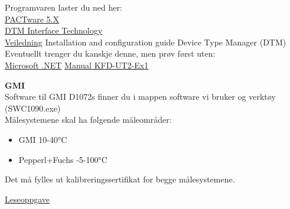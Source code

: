 Programvaren laster du ned her: 
\\
\href {https://www.pepperl-fuchs.com/norway/no/classid_163.htm?view=productdetails&prodid=83574#software}{PACTware 5.X}
\\
\href {https://www.pepperl-fuchs.com/norway/no/classid_1804.htm?view=productdetails&prodid=32802}{DTM Interface Technology}
\\
 

\href{https://files.pepperl-fuchs.com/webcat/navi/productInfo/doct/tdoct1599c_eng.pdf?v=20200320004907}{Veiledning} Installation and configuration guide Device Type Manager (DTM)
\\  
Eventuellt trenger du kanskje denne, men prøv først uten:
\\
\href {https://www.pepperl-fuchs.com/norway/no/classid_1805.htm?view=productdetails&prodid=27434}{Microsoft .NET}
\vskip 5pt 
\vskip 5pt 
\href {https://files.pepperl-fuchs.com/webcat/navi/productInfo/doct/tdoct0735e_eng.pdf?v=20200320004741}{Manual KFD-UT2-Ex1}

\vskip 5pt 

\textbf{GMI}
\\
Software til GMI D1072s finner du i mappen software vi bruker og verktøy (SWC1090.exe)
\\
Målesystemene skal ha følgende måleområder:
\begin{itemize}[noitemsep]
\item GMI 10-40°C
\item Pepperl+Fuchs -5-100°C
\end{itemize}

\vskip 5pt 

Det må fylles ut kalibreringssertifikat for begge målesystemene. 



\href {https://autofaget.no/temp/node2.html}{Leseoppgave}








\vfil \eject



















